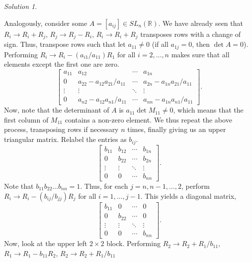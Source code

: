 \documentclass[11pt]{report}
\def\R{\mathbb{R}}
\theoremstyle{remark}
\newtheorem*{solution}{Solution}
\begin{document}
\begin{solution}
\begin{enumerate}
        Analogously, consider some $A = [a_{ij}] \in SL_n(\R)$. We have already seen
        that $R_i \to R_i + R_j$, $R_j \to R_j - R_i$, $R_i \to R_i + R_j$
        transposes rows with a change of sign. Thus, transpose rows such that let
        $a_{11} \neq 0$ (if all $a_{1j} = 0$, then $\det{A} = 0$). Performing $R_i
        \to R_i - (a_{i1} / a_{11})R_1$ for all $i = 2, \dots, n$ makes sure that
        all elements except the first one are zero. \[
            \begin{bmatrix}
                a_{11} & a_{12} & \cdots & a_{1n} \\
                0      & a_{22} - a_{12}a_{21} / a_{11} & \cdots & a_{2n} -
                a_{1n}a_{21} / a_{11} \\
                \vdots & \vdots & \ddots & \vdots \\
                0 & a_{n2} - a_{12}a_{n1} / a_{11} & \cdots & a_{nn} - a_{1n}a_{n1} / a_{11}
            \end{bmatrix}.
        \] Now, note that the determinant of $A$ is $a_{11} \det{M_{11}} \neq 0$, which
        means that the first column of $M_{11}$ contains a non-zero element. We thus
        repeat the above process, transposing rows if necessary $n$ times, finally
        giving us an upper triangular matrix. Relabel the entries as $b_{ij}$. \[
            \begin{bmatrix}
                b_{11} & b_{12} & \cdots & b_{1n} \\
                0 & b_{22} & \cdots & b_{2n} \\
                \vdots & \vdots & \ddots & \vdots \\
                0 & 0 & \cdots & b_{nn}
            \end{bmatrix}.
        \] Note that $b_{11} b_{22} \dots b_{nn} = 1$. Thus, for each $j = n, n-1,
        \dots, 2$, perform $R_i \to R_i - (b_{ij} / b_{jj})R_j$ for all $i = 1,
        \dots, j - 1$. This yields a diagonal matrix, \[
            \begin{bmatrix}
                b_{11} & 0 & \cdots & 0\\
                0 & b_{22} & \cdots & 0\\
                \vdots & \vdots & \ddots & \vdots \\
                0 & 0 & \cdots & b_{nn}
            \end{bmatrix}.
        \] Now, look at the upper left $2\times 2$ block. Performing $R_2 \to R_2 +
        R_1 / b_{11}$, $R_1 \to R_1 - b_{11}R_2$, $R_2 \to R_2 + R_1 / b_{11}$

\end{enumerate}
\end{solution}
\end{document}
